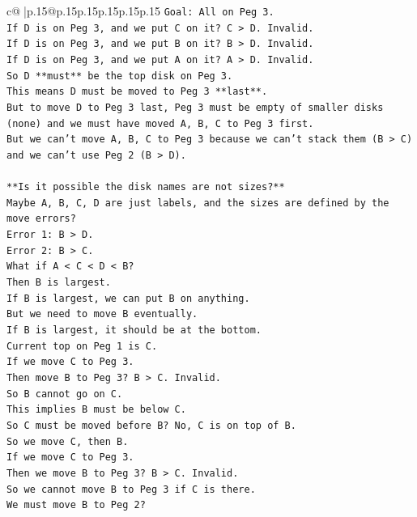 \documentclass{article}
\begin{document}
{\begin{supertabular}{c@{$\;$}|p{.15\linewidth}@{}p{.15\linewidth}p{.15\linewidth}p{.15\linewidth}p{.15\linewidth}p{.15\linewidth}}
{{{\texttt{Goal: All on Peg 3.} \\
\texttt{If D is on Peg 3, and we put C on it? C > D. Invalid.} \\
\texttt{If D is on Peg 3, and we put B on it? B > D. Invalid.} \\
\texttt{If D is on Peg 3, and we put A on it? A > D. Invalid.} \\
\texttt{So D **must** be the top disk on Peg 3.} \\
\texttt{This means D must be moved to Peg 3 **last**.} \\
\texttt{But to move D to Peg 3 last, Peg 3 must be empty of smaller disks (none) and we must have moved A, B, C to Peg 3 first.} \\
\texttt{But we can't move A, B, C to Peg 3 because we can't stack them (B > C) and we can't use Peg 2 (B > D).} \\
\\ 
\texttt{**Is it possible the disk names are not sizes?**} \\
\texttt{Maybe A, B, C, D are just labels, and the sizes are defined by the move errors?} \\
\texttt{Error 1: B > D.} \\
\texttt{Error 2: B > C.} \\
\texttt{What if A < C < D < B?} \\
\texttt{Then B is largest.} \\
\texttt{If B is largest, we can put B on anything.} \\
\texttt{But we need to move B eventually.} \\
\texttt{If B is largest, it should be at the bottom.} \\
\texttt{Current top on Peg 1 is C.} \\
\texttt{If we move C to Peg 3.} \\
\texttt{Then move B to Peg 3? B > C. Invalid.} \\
\texttt{So B cannot go on C.} \\
\texttt{This implies B must be below C.} \\
\texttt{So C must be moved before B? No, C is on top of B.} \\
\texttt{So we move C, then B.} \\
\texttt{If we move C to Peg 3.} \\
\texttt{Then we move B to Peg 3? B > C. Invalid.} \\
\texttt{So we cannot move B to Peg 3 if C is there.} \\
\texttt{We must move B to Peg 2?} \\
}}}
\end{supertabular}}
\end{document}
